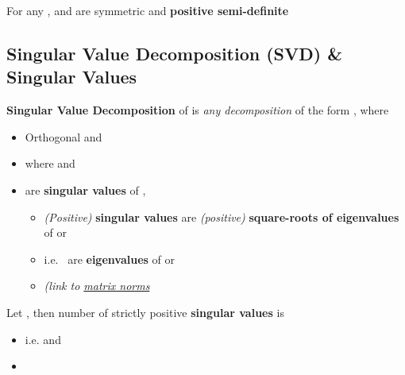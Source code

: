 \hSep %

For any ,  and
 are symmetric and \textbf{positive semi-definite}

\subsection*{Singular Value Decomposition (SVD) \& Singular Values}


\textbf{Singular Value Decomposition} of
 is \emph{any decomposition} of
the form , where

\begin{itemize}

      \item
            Orthogonal 
            and 
      \item
            where  and
      \item
             are \textbf{singular values}
            of ,

            \begin{itemize}

                  \item
                        \emph{(Positive)} \textbf{singular values} are \emph{(positive)}
                        \textbf{square-roots of eigenvalues} of  or
                  \item
                        i.e.~ are
                        \textbf{eigenvalues} of  or 
                  \item
                         \emph{(link to
                              \underline{matrix norms}}
            \end{itemize}
\end{itemize}

Let , then number of strictly positive
\textbf{singular values} is 

\begin{itemize}

      \item
            i.e.  and
      \item
\end{itemize}

